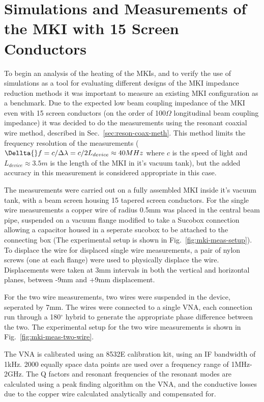 \section{Simulations and Measurements of the MKI with 15 Screen Conductors}

To begin an analysis of the heating of the MKIs, and to verify the use of simulations as a tool for evaluating different designs of the MKI impedance reduction methods it was important to measure an existing MKI configuration as a benchmark. Due to the expected low beam coupling impedance of the MKI even with 15 screen conductors (on the order of 100$\Omega$ longitudinal beam coupling impedance) it was decided to do the measurements using the resonant coaxial wire method, described in Sec.~\ref{sec:reson-coax-meth}. This method limits the frequency resolution of the measurements ($\Dellta{}f = c/\Delta \lambda = c/2L_{device} \approx 40MHz$ where $c$ is the speed of light and $L_{device}\approx 3.5m$ is the length of the MKI in it's vacuum tank), but the added accuracy in this measurement is considered appropriate in this case.

The measurements were carried out on a fully assembled MKI inside it's vacuum tank, with a beam screen housing 15 tapered screen conductors. For the single wire measurements a copper wire of radius 0.5mm was placed in the central beam pipe, suspended on a vacuum flange modified to take a Sucobox connection allowing a capacitor housed in a seperate sucobox to be attached to the connecting box (The experimental setup is shown in Fig.~\ref{fig:mki-meas-setup}). To displace the wire for displaced single wire measurements, a pair of nylon screws (one at each flange) were used to physically displace the wire. Displacements were taken at 3mm intervals in both the vertical and horizontal planes, between -9mm and +9mm displacement.

For the two wire measurements, two wires were suspended in the device, seperated by 7mm. The wires were connected to a single VNA, each connection run through a 180$^{\circ}$ hybrid to generate the appropriate phase difference between the two. The experimental setup for the two wire measurements is shown in Fig.~\ref{fig:mki-meas-two-wire}.

The VNA is calibrated using an 8532E calibration kit, using an IF bandwidth of 1kHz. 2000 equally space data points are used over a frequency range of 1MHz-2GHz. The Q factors and resonant frequencies of the resonant modes are calculated using a peak finding algorithm on the VNA, and the conductive losses due to the copper wire calculated analytically and compensated for.

